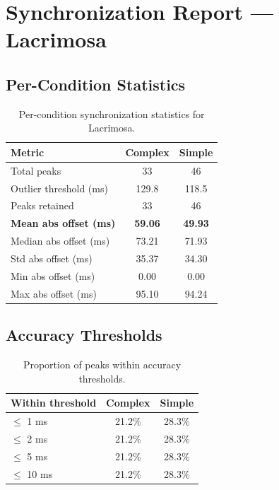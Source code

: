 
\section*{Synchronization Report --- Lacrimosa}

\subsection*{Per-Condition Statistics}

\begin{table}[h!]
\centering
\begin{tabular}{|l|c|c|}
\hline
Metric & Complex & Simple \\
\hline
Total peaks & 33 & 46 \\
Outlier threshold (ms) & 129.8 & 118.5 \\
Peaks retained & 33 & 46 \\
\textbf{Mean abs offset (ms)} & \textbf{59.06} & \textbf{49.93} \\
Median abs offset (ms) & 73.21 & 71.93 \\
Std abs offset (ms) & 35.37 & 34.30 \\
Min abs offset (ms) & 0.00 & 0.00 \\
Max abs offset (ms) & 95.10 & 94.24 \\
\hline
\end{tabular}
\caption{Per-condition synchronization statistics for Lacrimosa.}
\label{tab:sync_stats}
\end{table}

\subsection*{Accuracy Thresholds}

\begin{table}[h!]
\centering
\begin{tabular}{|l|c|c|}
\hline
Within threshold & Complex & Simple \\
\hline
$\leq$ 1 ms & 21.2\% & 28.3\% \\
$\leq$ 2 ms & 21.2\% & 28.3\% \\
$\leq$ 5 ms & 21.2\% & 28.3\% \\
$\leq$ 10 ms & 21.2\% & 28.3\% \\
\hline
\end{tabular}
\caption{Proportion of peaks within accuracy thresholds.}
\label{tab:sync_accuracy}
\end{table}

